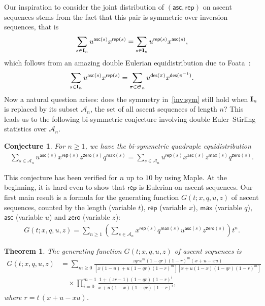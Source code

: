 \documentclass[12pt]{amsart}
\newcounter{mycount}
\theoremstyle{plain}
\newtheorem{theorem}[mycount]{Theorem}
\newtheorem{conjecture}[mycount]{Conjecture}
\theoremstyle{definition}
\theoremstyle{example}
\theoremstyle{remark}
\numberwithin{equation}{section}
\numberwithin{figure}{section}
\newcommand\des{\mathop{\rm des}}
\def\des{\mathsf{des}}
\newcommand{\asc}{\mathsf{asc}}
\def\max{\mathsf{max}}
\def\zero{\mathsf{zero}}
\def\rep{\mathsf{rep}}
\def\A{\mathcal{A}}
\def\I{\operatorname{{\bf I}}}
\def\S{\mathfrak{S}}
\begin{document}
Our inspiration to consider the joint distribution of $(\asc,\rep)$ on  ascent sequences stems from the fact that this pair is symmetric over inversion sequences, that is
\begin{equation}\label{inv:sym}
\sum_{s\in\I_n}
u^{\asc(s)}x^{\rep(s)}
=\sum_{s\in\I_n}
u^{\rep(s)}x^{\asc(s)},
\end{equation}
which follows from an amazing double Eulerian equidistribution due to Foata~\cite{fo}:
\begin{equation}\label{dou:fo}
\sum_{s\in\I_n}
u^{\asc(s)}x^{\rep(s)}=\sum_{\pi\in\S_n}u^{\des(\pi)}x^{\des(\pi^{-1})}.
\end{equation}
Now a natural question arises: does the symmetry in~\eqref{inv:sym} still hold when $\I_n$ is replaced by its subset $\A_n$, the set of all ascent sequences of length $n$? This leads us to the following bi-symmetric conjecture involving  double Euler--Stirling  statistics over $\A_n$.
\begin{conjecture}\label{conj1ref}
For $n\geq1$, we have the bi-symmetric quadruple equidistribution
\begin{align*}
\sum_{s\in\A_n}
u^{\asc(s)}x^{\rep(s)}z^{\zero(s)}q^{\max(s)}
=\sum_{s\in\A_n}
u^{\rep(s)}x^{\asc(s)}z^{\max(s)}q^{\zero(s)}.
\end{align*}
\end{conjecture}
This conjecture has been verified for  $n$ up to $10$ by using Maple. At the beginning, it is hard even to show that $\rep$ is Eulerian on ascent sequences.
Our first main result is a formula for the generating function $G(t;x,q,u,z)$ of ascent sequences, counted by the length (variable $t$), $\rep$ (variable $x$), $\max$ (variable $q$), $\asc$ (variable $u$) and $\zero$ (variable $z$):
\begin{align*}
G(t;x,q,u,z)=\sum_{n\geq1} \left(\sum_{s\in\A_n}
x^{\rep(s)}q^{\max(s)}u^{\asc(s)}z^{\zero(s)}\right)t^n.
\end{align*}

\begin{theorem}\label{T:gen}
The generating function $G(t;x,q,u,z)$ of ascent sequences is
\begin{align*}
G(t;x,q,u,z)&=\sum_{m\geq0}\frac{zqr x^m(1-qr)(1-r)^m(x+u-xu)}
{[x(1-u)+u(1-qr)(1-r)^m][x+u(1-x)(1-qr)(1-r)^m]}\\
&\quad\times \prod_{i=0}^{m-1}\frac{1+(zr-1)(1-qr)(1-r)^i}{x+u(1-x)(1-qr)(1-r)^i},
\end{align*}
where $r=t\,(x+u-xu)$.
\end{theorem}
\end{document}
